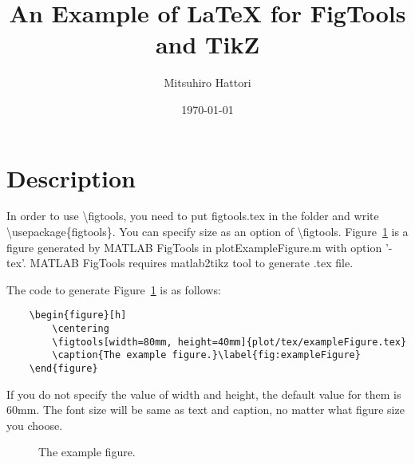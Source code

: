 \documentclass[dvipdfmx]{article}
\begin{document}
\title{An Example of \LaTeX \; for FigTools and TikZ}
\author{Mitsuhiro Hattori}
\date{\today}
\maketitle

\section{Description}
In order to use \textbackslash figtools, you need to put figtools.tex in the folder and write \textbackslash usepackage\{figtools\}.
You can specify size as an option of \textbackslash figtools.
Figure~\ref{fig:exampleFigure} is a figure generated by MATLAB FigTools in plotExampleFigure.m with option '-tex'.
MATLAB FigTools requires matlab2tikz tool to generate .tex file. \par
The code to generate Figure~\ref{fig:exampleFigure} is as follows:
\begin{lstlisting}
    \begin{figure}[h]
        \centering
        \figtools[width=80mm, height=40mm]{plot/tex/exampleFigure.tex}
        \caption{The example figure.}\label{fig:exampleFigure}
    \end{figure}
\end{lstlisting}
If you do not specify the value of width and height, the default value for them is 60mm.
The font size will be same as text and caption, no matter what figure size you choose.
\begin{figure}[h]
    \centering
    \caption{The example figure.}\label{fig:exampleFigure}
\end{figure}
\end{document}
